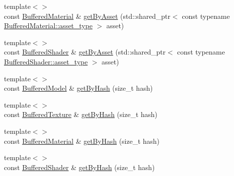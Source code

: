 \begin{DoxyCompactItemize}
{\footnotesize template$<$$>$ }\\const \hyperlink{classrenderer_1_1BufferedMaterial}{Buffered\-Material} \& \hyperlink{classrenderer_1_1ResourceManager_aa7cd4a1aacdda75bc2c2e106bb4e23ae}{get\-By\-Asset} (std\-::shared\-\_\-ptr$<$ const typename \hyperlink{classrenderer_1_1BufferObject_a651cbaff8aa7148d72a9eaf71ad3636e}{Buffered\-Material\-::asset\-\_\-type} $>$ asset)
\item 
{\footnotesize template$<$$>$ }\\const \hyperlink{classrenderer_1_1BufferedShader}{Buffered\-Shader} \& \hyperlink{classrenderer_1_1ResourceManager_a91f7250df37ffd6315ea5c8af120d392}{get\-By\-Asset} (std\-::shared\-\_\-ptr$<$ const typename \hyperlink{classrenderer_1_1BufferObject_a651cbaff8aa7148d72a9eaf71ad3636e}{Buffered\-Shader\-::asset\-\_\-type} $>$ asset)
\item 
{\footnotesize template$<$$>$ }\\const \hyperlink{classrenderer_1_1BufferedModel}{Buffered\-Model} \& \hyperlink{classrenderer_1_1ResourceManager_a29feb0f994d7cf35cfa2f9666b6ac17c}{get\-By\-Hash} (size\-\_\-t hash)
\item 
{\footnotesize template$<$$>$ }\\const \hyperlink{classrenderer_1_1BufferedTexture}{Buffered\-Texture} \& \hyperlink{classrenderer_1_1ResourceManager_ace89b999f2ef54dc5896bb21b6d66ced}{get\-By\-Hash} (size\-\_\-t hash)
\item 
{\footnotesize template$<$$>$ }\\const \hyperlink{classrenderer_1_1BufferedMaterial}{Buffered\-Material} \& \hyperlink{classrenderer_1_1ResourceManager_a0bf6d9ef75dd2de52eb9e75031f87058}{get\-By\-Hash} (size\-\_\-t hash)
\item 
{\footnotesize template$<$$>$ }\\const \hyperlink{classrenderer_1_1BufferedShader}{Buffered\-Shader} \& \hyperlink{classrenderer_1_1ResourceManager_ab7cb3b380e222cfbd3ad704fe1c3aa32}{get\-By\-Hash} (size\-\_\-t hash)
\end{DoxyCompactItemize}



